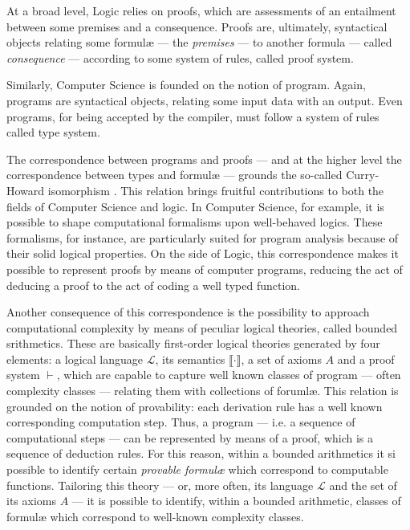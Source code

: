 At a broad level, Logic relies on proofs, which are assessments of an entailment between some premises and a consequence. Proofs are, ultimately, syntactical objects relating some formul\ae{} --- the \emph{premises} --- to another formula --- called \emph{consequence} --- according to some system of rules, called proof system.

Similarly, Computer Science is founded on the notion of program. Again, programs are syntactical objects, relating some input data with an output. Even programs, for being accepted by the compiler, must follow a system of rules called type system.

The correspondence between programs and proofs --- and at the higher level the correspondence between types and formul\ae{} --- grounds the so-called Curry-Howard isomorphism \cite{curry34, Howard}. This relation brings fruitful contributions to both the fields of Computer Science and logic. In Computer Science, for example, it is possible to shape computational formalisms upon well-behaved logics. These formalisms, for instance, are particularly suited for program analysis because of their solid logical properties. On the side of Logic, this correspondence makes it possible to represent proofs by means of computer programs, reducing the act of deducing a proof to the act of coding a well typed function.

Another consequence of this correspondence is the possibility to approach computational complexity by means of peculiar logical theories, called bounded srithmetics.
%
These are basically first-order logical theories generated by four elements: a logical language $\mathcal L$, its semantics $\llbracket \cdot\rrbracket$, a set of axioms $A$ and a proof system $\vdash$, which are capable to capture well known classes of program --- often complexity classes --- relating them with collections of foruml\ae{}.
%
This relation is grounded on the notion of provability: each derivation rule has a well known corresponding computation step. Thus, a program --- i.e. a sequence of computational steps --- can be represented by means of a proof, which is a sequence of deduction rules. For this reason, within a bounded arithmetics it si possible to identify certain \emph{provable formul\ae{}} which correspond to computable functions.
%
Tailoring this theory --- or, more often, its language $\mathcal L$ and the set of its axioms $A$ --- it is possible to identify, within a bounded arithmetic, classes of formul\ae{} which correspond to well-known complexity classes.

